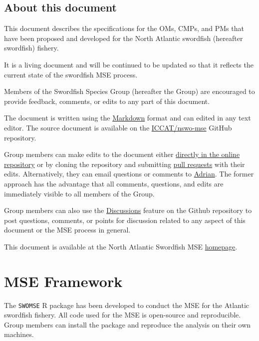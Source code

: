 \documentclass[
]{article}
\begin{document}
\hypertarget{about-this-document}{%
\subsection{About this document}\label{about-this-document}}

This document describes the specifications for the OMs, CMPs, and PMs that have been proposed and developed for the North Atlantic swordfish (hereafter swordfish) fishery.

It is a living document and will be continued to be updated so that it reflects the current state of the swordfish MSE process.

Members of the Swordfish Species Group (hereafter the Group) are encouraged to provide feedback, comments, or edits to any part of this document.

The document is written using the \href{https://www.markdownguide.org/}{Markdown} format and can edited in any text editor. The source document is available on the \href{https://github.com/ICCAT/nswo-mse/blob/master/docs/TS/Trial_Specs.Rmd}{ICCAT/nswo-mse} GitHub repository.

Group members can make edits to the document either \href{https://github.com/ICCAT/nswo-mse/edit/master/docs/TS/Trial_Specs.Rmd}{directly in the online repository} or by cloning the repository and submitting \href{https://github.com/ICCAT/nswo-mse/pulls}{pull requests} with their edits. Alternatively, they can email questions or comments to \href{mailto:adrian@bluematterscience.com}{Adrian}. The former approach has the advantage that all comments, questions, and edits are immediately visible to all members of the Group.

Group members can also use the \href{https://github.com/ICCAT/nswo-mse/discussions}{Discussions} feature on the Github repository to post questions, comments, or points for discussion related to any aspect of this document or the MSE process in general.

This document is available at the North Atlantic Swordfish MSE \href{https://iccat.github.io/nswo-mse/}{homepage}.

\hypertarget{mse-framework}{%
\section{MSE Framework}\label{mse-framework}}

The \texttt{SWOMSE} R package has been developed to conduct the MSE for the Atlantic swordfish fishery. All code used for the MSE is open-source and reproducible. Group members can install the package and reproduce the analysis on their own machines.
\end{document}

